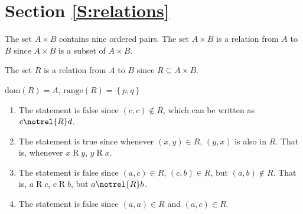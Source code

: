 \section*{Section \ref{S:relations}}

\begin{list}{\bf{\ref{exer:sec71-1}.}}
\item \begin{list}{\bf{(a)}}
\item The set  $A \times B$  contains  nine  ordered pairs.  The set  $A \times B$  is a relation from  $A$  to  $B$  since 
$A \times B$  is a subset of  $A \times B$.
\end{list}
\end{list}

\begin{list}{}
\item \begin{list}{\bf{(b)}}
\item The set  $R$  is a relation from  $A$  to  $B$  since  $R \subseteq A \times B$.
\end{list}
\end{list}

\begin{list}{}
\item \begin{list}{\bf{(c)}}
\item $\text{dom}( R ) = A$, $\text{range}( R ) = \left\{ {p, q} \right\}$
\end{list}
\end{list}




\begin{list}{\bf{\ref{exer:sec71-2}.}}
\item \begin{enumerate}
\item The statement is false since $\left( c, c \right) \notin R$, which can be written as $c \notrel{R} d$.
\item The statement is true since whenever $\left( x, y \right) \in R$, $\left( y, x \right)$ is also in $R$.  That is, whenever $x \mathrel{R} y$, 
$y\mathrel{R} x$.
\item The statement is false since $\left( a, c \right) \in R$, $\left( c, b \right) \in R$, but 
$\left( a, b \right) \notin R$.  That is, $a\mathrel{R} c$, $c \mathrel{R} b$, but $a \notrel{R} b$.
\item The statement is false since $\left( a, a \right) \in R$ and $\left( a, c \right) \in R$.
\end{enumerate}

\end{list}


